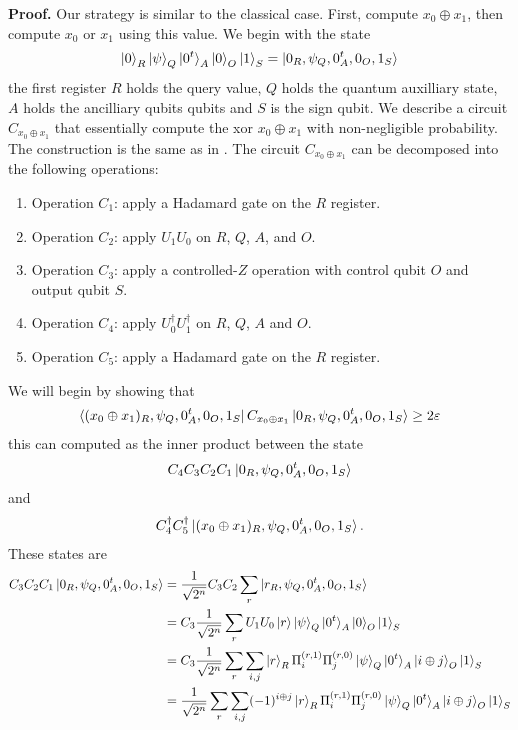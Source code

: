 \documentclass{article}
\begin{document}
\textbf{Proof.} Our strategy is similar to the classical case. First, compute $x_{0}\oplus x_{1}$, then compute $x_{0}$ or $x_{1}$ using this value.
 We begin with the state \begin{align}
    \ket{0}_{R}\ket{\psi}_{Q}\ket{0^{t}}_{A}\ket{0}_{O}\ket{1}_{S}=\ket{0_{R},\psi_{Q},0^{t}_{A},0_{O},1_{S}}
\end{align} the first register $R$ holds the query value, $Q$ holds the quantum auxilliary state, $A$ holds the ancilliary qubits qubits and $S$ is the sign qubit.
We describe a circuit $C_{x_{0}\oplus x_{1}}$ that essentially compute the xor $x_{0}\oplus x_{1}$ with non-negligible probability. The construction is the same as in \cite{qgllemma}. The circuit $C_{x_{0}\oplus x_{1}}$ can be decomposed into the following operations:
\begin{enumerate}
    \item Operation $C_{1}$: apply a Hadamard gate on the $R$ register.
    \item Operation $C_{2}$: apply $U_{1}U_{0}$ on $R$, $Q$, $A$, and $O$.
    \item Operation $C_{3}$: apply a controlled-$Z$ operation with control qubit $O$ and output qubit $S$.
    \item Operation $C_{4}$: apply $U_{0}^{\dagger}U_{1}^{\dagger}$ on $R$, $Q$, $A$ and $O$.
    \item Operation $C_{5}$: apply a Hadamard gate on the $R$ register.
\end{enumerate}
We will begin by showing that \begin{align}
    \bra{(x_{0}\oplus x_{1})_{R},\psi_{Q},0^{t}_{A},0_{O},1_{S}}C_{x_{0}\oplus x_{1}}\ket{0_{R},\psi_{Q},0^{t}_{A},0_{O},1_{S}} \geq 2\varepsilon
\end{align} this can computed as the inner product between the state \begin{align}C_{4}C_{3}C_{2}C_{1}\ket{0_{R},\psi_{Q},0^{t}_{A},0_{O},1_{S}}\end{align} and \begin{align}C_{4}^{\dagger}C_{5}^{\dagger}\ket{(x_{0}\oplus x_{1})_{R},\psi_{Q},0^{t}_{A},0_{O},1_{S}}.\end{align} These states are
\begin{align}
    C_{3}C_{2}C_{1}\ket{0_{R},\psi_{Q},0^{t}_{A},0_{O},1_{S}}&=\frac{1}{\sqrt{2^{n}}}C_{3}C_{2}\sum_{r}\ket{r_{R},\psi_{Q},0^{t}_{A},0_{O},1_{S}}\\
    &=C_{3}\frac{1}{\sqrt{2^{n}}}\sum_{r}{U_{1}U_{0}\ket{r}\ket{\psi}_{Q}\ket{0^{t}}_{A}\ket{0}_{O}}\ket{1}_{S}\\&=C_{3}\frac{1}{\sqrt{2^{n}}}\sum_{r}{\sum_{i,j}\ket{r}_{R}\Pi_{i}^{(r,1)}\Pi_{j}^{(r,0)}\ket{\psi}_{Q}\ket{0^{t}}_{A}}\ket{i\oplus j}_{O}\ket{1}_{S}\\&=\frac{1}{\sqrt{2^{n}}}\sum_{r}{\sum_{i,j}(-1)^{i\oplus j}\ket{r}_{R}\Pi_{i}^{(r,1)}\Pi_{j}^{(r,0)}\ket{\psi}_{Q}\ket{0^{t}}_{A}}\ket{i\oplus j}_{O}\ket{1}_{S}
\end{align}
\end{document}
